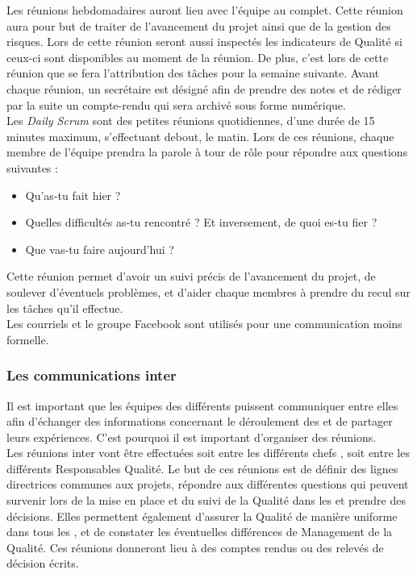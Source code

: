 Les réunions hebdomadaires auront lieu avec l’équipe au complet. Cette réunion aura pour but de traiter de l’avancement du projet ainsi que de la gestion des risques. Lors de cette réunion seront aussi inspectés les indicateurs de Qualité si ceux-ci sont disponibles au moment de la réunion. De plus, c’est lors de cette réunion que se fera l’attribution des tâches pour la semaine suivante. Avant chaque réunion, un secrétaire est désigné afin de prendre des notes et de rédiger par la suite un compte-rendu qui sera archivé sous forme numérique.\\

Les \textit{Daily Scrum} sont des petites réunions quotidiennes, d’une durée de 15 minutes maximum, s’effectuant debout, le matin. Lors de ces réunions, chaque membre de l’équipe prendra la parole à tour de rôle pour répondre aux questions suivantes :
\begin{itemize}
\item Qu’as-tu fait hier ?
\item Quelles difficultés as-tu rencontré ? Et inversement, de quoi es-tu fier ?
\item Que vas-tu faire aujourd’hui ?
\end{itemize}
Cette réunion permet d’avoir un suivi précis de l’avancement du projet, de soulever d'éventuels problèmes, et d’aider chaque membres à prendre du recul sur les tâches qu’il effectue.\\

Les courriels et le groupe Facebook sont utilisés pour une communication moins formelle. 

\subsubsection*{Les communications inter\picCourt{}}  

Il est important que les équipes des différents \PICCourt puissent communiquer entre elles afin d’échanger des informations concernant le déroulement des \PICCourt et de partager leurs expériences. C'est pourquoi il est important d'organiser des réunions.\\

Les réunions inter\PICCourt{} vont être effectuées soit entre les différents chefs \PICCourt{}, soit entre les différents Responsables Qualité. Le but de ces réunions est de définir des lignes directrices communes aux projets, répondre aux différentes questions qui peuvent survenir lors de la mise en place et du
suivi de la Qualité dans les \PICCourt et prendre des décisions. Elles permettent également d’assurer la Qualité de manière uniforme dans tous les \PICCourt, et de constater les éventuelles différences de Management de la Qualité. Ces réunions donneront lieu à des comptes rendus ou des relevés de décision écrits.

